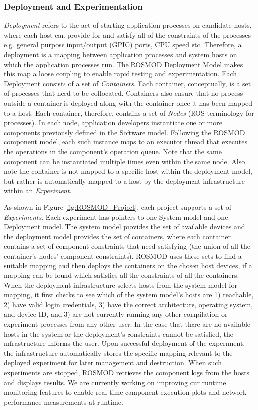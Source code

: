 \subsubsection{Deployment and Experimentation}

\emph{Deployment} refers to the act of starting application processes
on candidate hosts, where each host can provide for and satisfy all of
the constraints of the processes e.g. general purpose input/output
(GPIO) ports, CPU speed etc. Therefore, a deployment is a mapping
between application processes and system hosts on which the
application processes run.  The ROSMOD Deployment Model makes this map
a loose coupling to enable rapid testing and experimentation. Each
Deployment consists of a set of \emph{Containers}. Each container,
conceptually, is a set of processes that need to be
collocated. Containers also ensure that no process outside a container
is deployed along with the container once it has been mapped to a
host. Each container, therefore, contains a set of \emph{Nodes} (ROS
terminology for processes). In each node, application developers
instantiate one or more components previously defined in the Software
model. Following the ROSMOD component model, each such instance maps to an
executor thread that executes the operations in the component's
operation queue.  Note that the same component can be instantiated
multiple times even within the same node. Also note the container is
not mapped to a specific host within the deployment model, but rather
is automatically mapped to a host by the deployment infrastructure
within an \emph{Experiment}.

As shown in Figure \ref{fig:ROSMOD_Project}, each project supports a
set of \emph{Experiments}. Each experiment has pointers to one System
model and one Deployment model. The system model provides the set of
available devices and the deployment model provides the set of
containers, where each container contains a set of component
constraints that need satisfying (the union of all the container's
nodes' component constraints). ROSMOD uses these sets to find a
suitable mapping and then deploys the containers on the chosen host
devices, if a mapping can be found which satisfies all the constraints
of all the containers.  When the deployment infrastructure selects
hosts from the system model for mapping, it first checks to see which
of the system model's hosts are 1) reachable, 2) have valid login
credentials, 3) have the correct architecture, operating system, and
device ID, and 3) are not currently running any other compilation or
experiment processes from any other user.  In the case that there are
no available hosts in the system or the deployment's constraints
cannot be satisfied, the infrastructure informs the user.  Upon
successful deployment of the experiment, the infrastructure
automatically stores the specific mapping relevant to the deployed
experiment for later management and destruction. When such experiments
are stopped, ROSMOD retrieves the component logs from the hosts and
displays results. We are currently working on improving our runtime
monitoring features to enable real-time component execution plots and
network performance measurements at runtime.

